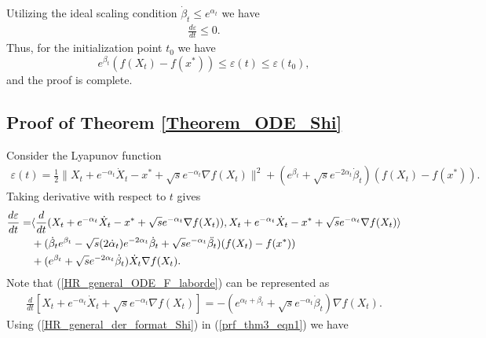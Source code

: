 \documentclass{article}
\theoremstyle{plain}
\theoremstyle{definition}
\theoremstyle{remark}
\begin{document}
Utilizing the ideal scaling condition $\dot \beta_t\leq e^{\alpha_t}$ we have
\begin{align}
     \frac{d \varepsilon}{dt}\leq 0.\nonumber
\end{align}
Thus, for the initialization point $t_0$ we have
$$e^{\beta_t}(f(X_t)-f(x^*))\leq \varepsilon(t)\leq \varepsilon(t_0),$$
and the proof is complete.
\subsection{Proof of Theorem \ref{Theorem_ODE_Shi}}\label{thm3_proof}
Consider the Lyapunov function 
\begin{align}\label{lyap_theorem3}
    \varepsilon(t)=\frac{1}{2}\|X_t+e^{-\alpha_t}\dot X_t-x^*+\sqrt{s}e^{-\alpha_t}\nabla f(X_t)\|^2+(e^{\beta_t}+\sqrt{s}e^{-2\alpha_t}\dot \beta_t)(f(X_t)-f(x^*)).
\end{align}
Taking derivative with respect to $t$ gives
\begin{align}\label{prf_thm3_eqn1}
    \frac{d \varepsilon}{dt}=&\langle \frac{d}{dt}(X_t+e^{-\alpha_t}\dot X_t-x^*+\sqrt{s}e^{-\alpha_t}\nabla f(X_t)),X_t+e^{-\alpha_t}\dot X_t-x^*+\sqrt{s}e^{-\alpha_t}\nabla f(X_t)\rangle\nonumber\\
    & +(\dot \beta_te^{\beta_t}-\sqrt{s}(2\dot \alpha_t)e^{-2\alpha_t}\dot \beta_t +\sqrt{s}e^{-\alpha_t}\Ddot{\beta_t})(f(X_t)-f(x^*))\nonumber\\
    &+(e^{\beta_t}+\sqrt{s}e^{-2\alpha_t}\dot \beta_t)\dot X_t\nabla f(X_t).
\end{align}
Note that (\ref{HR_general_ODE_F_laborde}) can be represented as
\begin{align}\label{HR_general_der_format_Shi}
    \frac{d}{dt}\left[X_t+e^{-\alpha_t}\dot X_t+\sqrt{s}e^{-\alpha_t}\nabla f(X_t)\right]=-\left(e^{\alpha_t+\beta_t}+\sqrt{s}e^{-\alpha_t}\dot \beta_t \right)\nabla f(X_t).
\end{align}
Using (\ref{HR_general_der_format_Shi}) in (\ref{prf_thm3_eqn1}) we have
\end{document}

